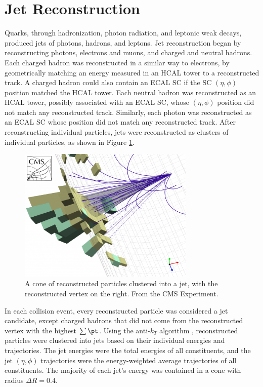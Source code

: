 \section{Jet Reconstruction}
\label{sec:jetReco}
Quarks, through hadronization, photon radiation, and leptonic weak decays, produced jets of photons, 
hadrons, and leptons.  Jet reconstruction began by reconstructing photons, 
electrons and muons, and charged and neutral hadrons.  Each charged hadron was reconstructed in a 
similar way to electrons, by geometrically matching an energy measured in an HCAL tower to a 
reconstructed track.  A charged hadron could also contain an ECAL SC if the SC $(\eta, \phi)$ position 
matched the HCAL tower.  Each neutral hadron was reconstructed as an HCAL tower, possibly associated with 
an ECAL SC, whose $(\eta, \phi)$ position did not match any reconstructed track.  Similarly, 
each photon was reconstructed as an ECAL SC whose position did not match any reconstructed track.  
After reconstructing individual particles, jets were reconstructed as clusters of individual particles, 
as shown in Figure \ref{fig:jetClustering}.

\begin{figure}[h]
	\centering
	\includegraphics[width=0.75\textwidth]{figures/jetClusteringInCMS.png}
	\caption{A cone of reconstructed particles clustered into a jet, with the reconstructed vertex on the right.  
	From the CMS Experiment.}
	\label{fig:jetClustering}
\end{figure}

In each collision event, every reconstructed particle was considered a jet candidate, except charged 
hadrons that did not come from the reconstructed vertex with the highest $\sum \pt$.  Using the 
anti-$k_{T}$ algorithm \cite{antikt}, reconstructed particles were clustered into jets 
based on their individual energies and trajectories.  The jet energies were the total energies of 
all constituents, and the jet $(\eta, \phi)$ trajectories were the energy-weighted average trajectories 
of all constituents.  The majority of each jet's energy was contained in a cone with radius $\Delta R = 0.4$.


